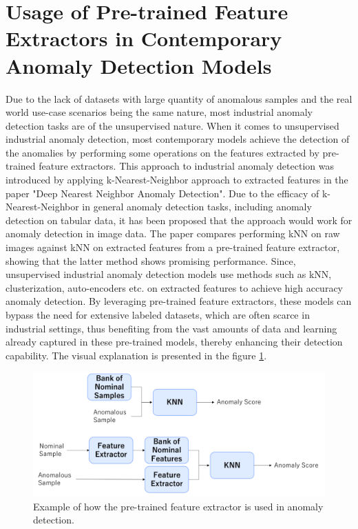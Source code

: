 \section{Usage of Pre-trained Feature Extractors in Contemporary Anomaly Detection Models}
Due to the lack of datasets with large quantity of anomalous samples and the real world use-case scenarios being the same nature, most industrial anomaly detection tasks are of the unsupervised nature. When it comes to unsupervised industrial anomaly detection, most contemporary models achieve the detection of the anomalies by performing some operations on the features extracted by pre-trained feature extractors. This approach to industrial anomaly detection was introduced by applying k-Nearest-Neighbor approach to extracted features in the paper "Deep Nearest Neighbor Anomaly Detection". Due to the efficacy of k-Nearest-Neighbor in general anomaly detection tasks, including anomaly detection on tabular data, it has been proposed that the approach would work for anomaly detection in image data. The paper compares performing kNN on raw images against kNN on extracted features from a pre-trained feature extractor, showing that the latter method shows promising performance. Since, unsupervised industrial anomaly detection models use methods such as kNN, clusterization, auto-encoders etc. on extracted features to achieve high accuracy anomaly detection. By leveraging pre-trained feature extractors, these models can bypass the need for extensive labeled datasets, which are often scarce in industrial settings, thus benefiting from the vast amounts of data and learning already captured in these pre-trained models, thereby enhancing their detection capability. The visual explanation is presented in the figure \ref{fig:feature_extractor_usage}.

\begin{figure}[h]
	\begin{center}
		\includegraphics[width=1.0\linewidth]{Chapter_3/feature_extractor_usage.png}
	\end{center}
	\caption{Example of how the pre-trained feature extractor is used in anomaly detection.}
	\label{fig:feature_extractor_usage}
\end{figure} 	

